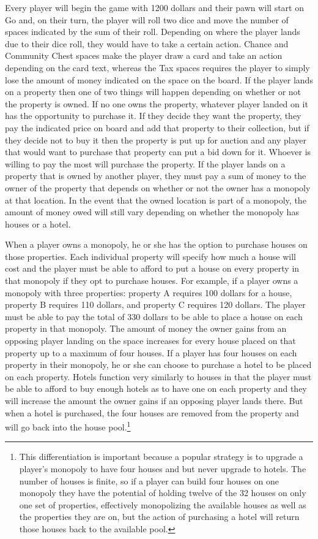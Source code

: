 \documentclass{article}
\begin{document}
Every player will begin the game with 1200 dollars and their pawn will start on Go and, on their turn, the player will roll two dice and move the number of spaces indicated by the sum of their roll.  Depending on where the player lands due to their dice roll, they would have to take a certain action.  Chance and Community Chest spaces make the player draw a card and take an action depending on the card text, whereas the Tax spaces requires the player to simply lose the amount of money indicated on the space on the board.  If the player lands on a property then one of two things will happen depending on whether or not the property is owned.  If no one owns the property, whatever player landed on it has the opportunity to purchase it.  If they decide they want the property, they pay the indicated price on board and add that property to their collection, but if they decide not to buy it then the property is put up for auction and any player that would want to purchase that property can put a bid down for it.  Whoever is willing to pay the most will purchase the property.  If the player lands on a property that is owned by another player, they must pay a sum of money to the owner of the property that depends on whether or not the owner has a monopoly at that location.  In the event that the owned location is part of a monopoly, the amount of money owed will still vary depending on whether the monopoly has houses or a hotel.

When a player owns a monopoly, he or she has the option to purchase houses on those properties.  Each individual property will specify how much a house will cost and the player must be able to afford to put a house on every property in that monopoly if they opt to purchase houses.  For example, if a player owns a monopoly with three properties: property A requires 100 dollars for a house, property B requires 110 dollars, and property C requires 120 dollars.  The player must be able to pay the total of 330 dollars to be able to place a house on each property in that monopoly.  The amount of money the owner gains from an opposing player landing on the space increases for every house placed on that property up to a maximum of four houses.  If a player has four houses on each property in their monopoly, he or she can choose to purchase a hotel to be placed on each property.  Hotels function very similarly to houses in that the player must be able to afford to buy enough hotels as to have one on each property and they will increase the amount the owner gains if an opposing player lands there. But when a hotel is purchased, the four houses are removed from the property and will go back into the house pool.\footnote{This differentiation is important because a popular strategy is to upgrade a player's monopoly to have four houses and but never upgrade to hotels.  The number of houses is finite, so if a player can build four houses on one monopoly they have the potential of holding twelve of the 32 houses on only one set of properties, effectively monopolizing the available houses as well as the properties they are on, but the action of purchasing a hotel will return those houses back to the available pool.} 
\end{document}

